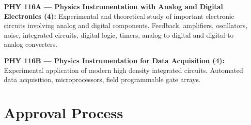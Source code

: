 \documentclass[12pt]{article}
\begin{document}
\vskip 1cm
\noindent
{\bf PHY 116A --- Physics Instrumentation with Analog and Digital Electronics (4):}  
Experimental and theoretical study of important electronic circuits
involving analog and digital components.  Feedback, amplifiers,
oscillators, noise, integrated circuits, digital logic, timers,
analog-to-digital and digital-to-analog converters.

\vskip 1cm
\noindent 
{\bf PHY 116B --- Physics Instrumentation for Data Acquisition (4):}  
Experimental application of modern high density integrated circuits.
Automated data acquisition,  microprocessors, field programmable gate arrays.

\section{Approval Process}
\label{sec:approval}
\end{document}
